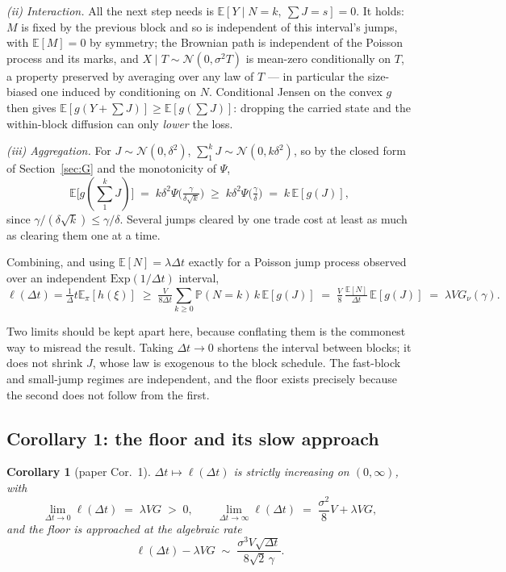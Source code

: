 \documentclass[11pt]{article}
\newtheorem{corollary}{Corollary}
\theoremstyle{definition}
\theoremstyle{remark}
\newcommand{\E}{\mathbb{E}}
\newcommand{\Prob}{\mathbb{P}}
\newcommand{\dt}{\Delta t}
\newcommand{\1}{\mathbf{1}}
\begin{document}
\emph{(ii) Interaction.} All the next step needs is $\E[Y\mid N{=}k,\ \textstyle\sum J=s]=0$. It holds: $M$ is fixed by the previous block and so is independent of this interval's jumps, with $\E[M]=0$ by symmetry; the Brownian path is independent of the Poisson process and its marks, and $X\mid T\sim\mathcal N(0,\sigma^2T)$ is mean-zero conditionally on $T$, a property preserved by averaging over any law of $T$ --- in particular the size-biased one induced by conditioning on $N$. Conditional Jensen on the convex $g$ then gives $\E[g(Y+\sum J)]\ge\E[g(\sum J)]$: dropping the carried state and the within-block diffusion can only \emph{lower} the loss.

\emph{(iii) Aggregation.} For $J\sim\mathcal N(0,\delta^2)$, $\sum_1^k J\sim\mathcal N(0,k\delta^2)$, so by the closed form of Section~\ref{sec:G} and the monotonicity of $\Psi$,
\[
\E\big[g(\textstyle\sum_1^kJ)\big] \;=\; k\delta^2\Psi\big(\tfrac{\gamma}{\delta\sqrt k}\big) \;\ge\; k\delta^2\Psi\big(\tfrac\gamma\delta\big) \;=\; k\,\E[g(J)],
\]
since $\gamma/(\delta\sqrt k)\le\gamma/\delta$. Several jumps cleared by one trade cost at least as much as clearing them one at a time.

Combining, and using $\E[N]=\lambda\dt$ exactly for a Poisson jump process observed over an independent $\mathrm{Exp}(1/\dt)$ interval,
\[
\ell(\dt) = \tfrac1\dt\E_\pi[h(\xi)] \;\ge\; \tfrac{V}{8\dt}\sum_{k\ge0}\Prob(N{=}k)\,k\,\E[g(J)] \;=\; \tfrac V8\,\tfrac{\E[N]}{\dt}\,\E[g(J)] \;=\; \lambda VG_\nu(\gamma).
\]

Two limits should be kept apart here, because conflating them is the commonest way to misread the result. Taking $\dt\to0$ shortens the interval between blocks; it does not shrink $J$, whose law is exogenous to the block schedule. The fast-block and small-jump regimes are independent, and the floor exists precisely because the second does not follow from the first.

\subsection{Corollary 1: the floor and its slow approach}\label{sec:cor1}

\begin{corollary}[paper Cor.~1]\label{cor:floor}
$\dt \mapsto \ell(\dt)$ is strictly increasing on $(0,\infty)$, with
\[
\lim_{\dt\to0}\ell(\dt) \;=\; \lambda V G \;>\; 0,
\qquad
\lim_{\dt\to\infty}\ell(\dt) \;=\; \frac{\sigma^2}{8}V + \lambda V G,
\]
and the floor is approached at the algebraic rate
\[
\ell(\dt) - \lambda VG \;\sim\; \frac{\sigma^3 V\sqrt{\dt}}{8\sqrt2\,\gamma}.
\]
\end{corollary}
\end{document}
